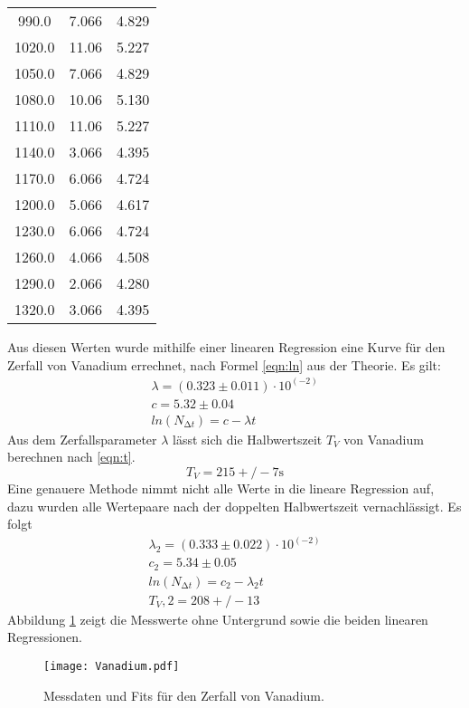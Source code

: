 \begin{table}
\begin{tabular}{c c c}
  990.0   & 7.066  & 4.829  \\
  1020.0  & 11.06  & 5.227  \\
  1050.0  & 7.066  & 4.829  \\
  1080.0  & 10.06  & 5.130  \\
  1110.0  & 11.06  & 5.227  \\
  1140.0  & 3.066  & 4.395  \\
  1170.0  & 6.066  & 4.724  \\
  1200.0  & 5.066  & 4.617  \\
  1230.0  & 6.066  & 4.724  \\
  1260.0  & 4.066  & 4.508  \\
  1290.0  & 2.066  & 4.280  \\
  1320.0  & 3.066  & 4.395  \\
  \bottomrule
 \end{tabular}
\end{table}
\FloatBarrier
\noindent Aus diesen Werten wurde mithilfe einer linearen Regression
eine Kurve für den Zerfall von Vanadium errechnet, nach Formel \eqref{eqn:ln}
aus der Theorie. Es gilt:
\begin{align*}
    \lambda = (0.323 \pm 0.011) \cdot 10^(-2) \\
    c = 5.32 \pm 0.04 \\
    ln(N_{\increment t}) = c - \lambda t 
\end{align*}
Aus dem Zerfallsparameter $\lambda$ lässt sich die Halbwertszeit $T_V$ von
Vanadium berechnen nach \eqref{eqn:t}.
\begin{equation*}
    T_V = 215+/-7 \si{\s}
\end{equation*}
Eine genauere Methode nimmt nicht alle Werte in die lineare Regression auf,
dazu wurden alle Wertepaare nach der doppelten Halbwertszeit vernachlässigt.
Es folgt
\begin{align*}
    \lambda_2 = (0.333 \pm 0.022) \cdot 10^(-2) \\
    c_2 = 5.34 \pm 0.05 \\
    ln(N_{\increment t}) = c_2 - \lambda_2 t \\
    T_V,2 = 208+/-13
\end{align*}
Abbildung \ref{fig:vankurve}
zeigt die Messwerte ohne Untergrund sowie die beiden linearen Regressionen.

\begin{figure}
 \centering
 \texttt{[image: Vanadium.pdf]}
 \caption{Messdaten und Fits für den Zerfall von Vanadium.}
 \label{fig:vankurve}
\end{figure}
\FloatBarrier

